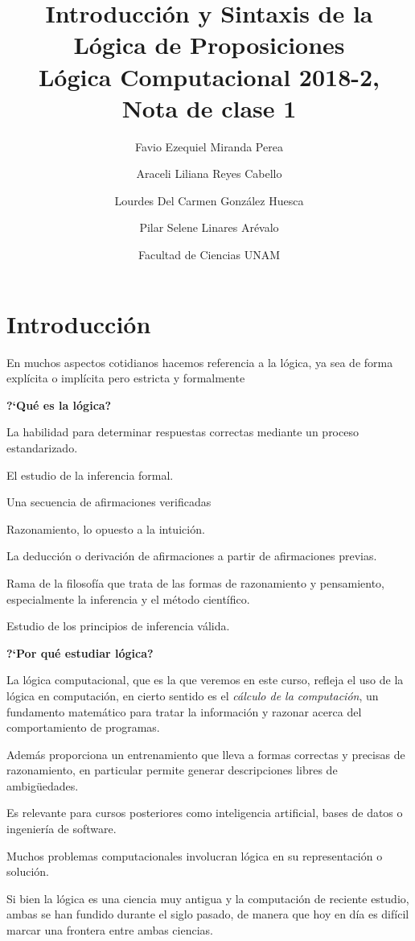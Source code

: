 \documentclass[11pt,letterpaper]{article}
\title{Introducci\'on y Sintaxis de la L\'ogica de Proposiciones \\
Lógica Computacional 2018-2, Nota de clase 1}
\author{Favio Ezequiel Miranda Perea\and Araceli Liliana Reyes Cabello\and
Lourdes Del Carmen Gonz\'alez Huesca \and Pilar Selene Linares Ar\'evalo}
\date{ Facultad de Ciencias UNAM}
\begin{document}
\maketitle

\section{Introducci\'on}
En muchos aspectos cotidianos hacemos referencia a la l\'ogica, ya sea de forma 
expl\'icita o impl\'icita pero estricta y formalmente 
\begin{center}
 \textbf{?`Qué es la l\'ogica?}
\end{center}
\bi
\item La habilidad para determinar respuestas correctas mediante un proceso
  estandarizado.
\item El estudio de la inferencia formal.
\item Una secuencia de afirmaciones verificadas
\item Razonamiento, lo opuesto a la intuici\'on.
\item La deducción o derivación de afirmaciones a partir de afirmaciones 
previas.
\item Rama de la filosof\'ia que trata de las formas de razonamiento y 
pensamiento, especialmente la inferencia y el método científico.
\item Estudio de los principios de inferencia v\'alida.
\ei
 
\begin{center}
 \textbf{?`Por qué estudiar l\'ogica?}
\end{center}
\bi
 \item La l\'ogica computacional, que es la que veremos en este curso, 
  refleja el uso de la l\'ogica en computación, en cierto sentido es el 
 \emph{cálculo de la computación}, un fundamento matemático para tratar la 
  información y razonar acerca del comportamiento de programas.
 \item Además proporciona un entrenamiento que lleva a formas correctas y 
  precisas de razonamiento, en particular permite generar descripciones libres 
  de ambigüedades.
 \item Es relevante para cursos posteriores como inteligencia artificial, bases 
  de datos o ingeniería de software.
 \item Muchos problemas computacionales involucran l\'ogica en su representación
  o solución.
 \item Si bien la l\'ogica es una ciencia muy antigua y la computación de 
  reciente estudio, ambas se han fundido durante el siglo pasado, de manera 
  que hoy en d\'ia es difícil marcar una frontera entre ambas ciencias. 
\ei
\end{document}
